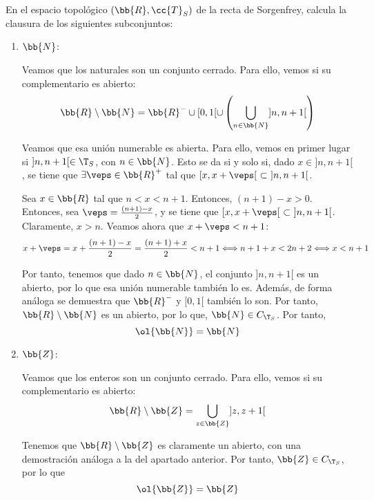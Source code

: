 \begin{ejercicio}
    En el espacio topológico $(\bb{R}, \cc{T}_S)$ de la recta de Sorgenfrey, calcula la clausura de los siguientes subconjuntos:
    \begin{enumerate}
        \item $\bb{N}$:

        Veamos que los naturales son un conjunto cerrado. Para ello, vemos si su complementario es abierto:
        \begin{equation*}
            \bb{R}\setminus \bb{N} = \bb{R}^-\cup [0,1[\cup \left(\bigcup_{n\in \bb{N}}]n,n+1[\right)
        \end{equation*}

        Veamos que esa unión numerable es abierta. Para ello, vemos en primer lugar si $]n,n+1[\in \T_S$, con $n\in \bb{N}$. Esto se da si y solo si, dado $x\in ]n,n+1[$, se tiene que $\exists \veps\in \bb{R}^+$ tal que $[x,x+\veps[~\subset~ ]n,n+1[$.

        Sea $x\in \bb{R}$ tal que $n<x<n+1$. Entonces, $(n+1)-x>0$. Entonces, sea $\veps=\frac{(n+1)-x}{2}$, y se tiene que $[x,x+\veps[~\subset~]n,n+1[$. Claramente, $x>n$. Veamos ahora que $x+\veps<n+1$:
        \begin{equation*}
            x+\veps=x+\frac{(n+1)-x}{2}
            = \frac{(n+1)+x}{2}
            < n+1 \Longleftrightarrow n+1+x<2n+2 \Longleftrightarrow x<n+1
        \end{equation*}

        Por tanto, tenemos que dado $n\in \bb{N}$, el conjunto $]n,n+1[$ es un abierto, por lo que esa unión numerable también lo es. Además, de forma análoga se demuestra que $\bb{R}^-$ y $[0,1[$ también lo son. Por tanto, $\bb{R}\setminus \bb{N}$ es un abierto, por lo que, $\bb{N}\in C_{\T_S}$. Por tanto,
        $$\ol{\bb{N}}=\bb{N}$$
        
        \item $\bb{Z}$:
        
        Veamos que los enteros son un conjunto cerrado. Para ello, vemos si su complementario es abierto:
        \begin{equation*}
            \bb{R}\setminus \bb{Z} = \bigcup_{z\in \bb{Z}}]z,z+1[
        \end{equation*}
        
        Tenemos que $\bb{R}\setminus \bb{Z}$ es claramente un abierto, con una demostración análoga a la del apartado anterior. Por tanto, $\bb{Z}\in C_{\T_S}$, por lo que
        $$\ol{\bb{Z}}=\bb{Z}$$
        

\end{enumerate}
\end{ejercicio}
